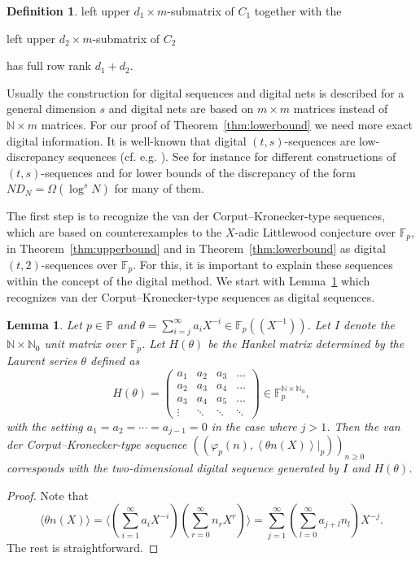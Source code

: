 \documentclass{article}
\newcommand{\NN}{\mathbb N}
\newcommand{\PP}{\mathbb P}
\newcommand{\FF}{\mathbb{F}}
\renewcommand{\(}{\left (}
\renewcommand{\)}{\right )}
\newtheorem{lemma}[theorem]{Lemma}
\theoremstyle{definition}
\newtheorem{definition}[theorem]{Definition}
\numberwithin{equation}{section}
\begin{document}
\begin{definition}
left upper $d_1 \times m$-submatrix of $C_1$ together with the

left upper $d_2 \times m$-submatrix of $C_2$ 

\noindent has full row rank $d_1+d_2$.

\end{definition}

Usually the construction for digital sequences and digital nets is described for a general dimension $s$ and digital nets are based on $m\times m$ matrices instead of $\NN\times m$ matrices. For our proof of Theorem~\ref{thm:lowerbound} we need more exact digital information. 
It is well-known that digital $(t,s)$-sequences are low-discrepancy sequences (cf. e.g. \cite[Theorem~4.17]{niesiam}). See for instance \cite{faure,Hofer,HoNie,nie,NieYeo,sobol,NieXing} for different constructions of $(t,s)$-sequences and \cite{Levints1,Levints2} for lower bounds of the discrepancy of the form $ND_N=\Omega(\log^s N)$ for many of them.  
 


The first step is to recognize the van der Corput--Kronecker-type sequences, which are based on counterexamples to the $X$-adic Littlewood conjecture over $\FF_p$, in Theorem~\ref{thm:upperbound} and in Theorem~\ref{thm:lowerbound} as digital $(t,2)$-sequences over $\FF_p$. For this, it is important to explain these sequences within the concept of the digital method. We start with Lemma~\ref{ref:identifymatrices} which recognizes van der Corput--Kronecker-type sequences as digital sequences. 

\begin{lemma}\label{ref:identifymatrices}
Let $p\in\PP$ and $\theta=\sum_{i=j}^\infty a_iX^{-i}\in\FF_p((X^{-1}))$. Let $I$ denote the $\NN\times \NN_0$ unit matrix over $\FF_p$. Let $H(\theta)$ be the \emph{Hankel matrix} determined by the Laurent series $\theta$ defined as
$$H(\theta)=\begin{pmatrix} a_1&a_2&a_3&\ldots \\
	a_2&a_3&a_4&\ldots \\
	a_3&a_4&a_5&\ldots \\
	\vdots &\ddots&\ddots&\ddots\end{pmatrix}\in\FF_p^{\NN\times \NN_0},$$
 with the setting $a_1=a_2=\cdots=a_{j-1}=0$ in the case where $j>1$. Then the van der Corput--Kronecker-type sequence $((\varphi_p(n),{\left<  \theta n(X)\right>}|_p))_{n\geq 0}$ corresponds with the two-dimensional digital sequence generated by $I$ and $H(\theta)$. 
\end{lemma}
\begin{proof}
	Note that 
	$$\langle \theta n(X)\rangle=\langle \left(\sum_{i=1}^\infty a_iX^{-i}\right) \left(\sum_{r=0}^\infty n_rX^r\right)\rangle=\sum_{j=1}^\infty\left(\sum_{l=0}^\infty a_{j+l}n_l\right)X^{-j}. $$
	The rest is straightforward.
	
\end{proof}
\end{document}

